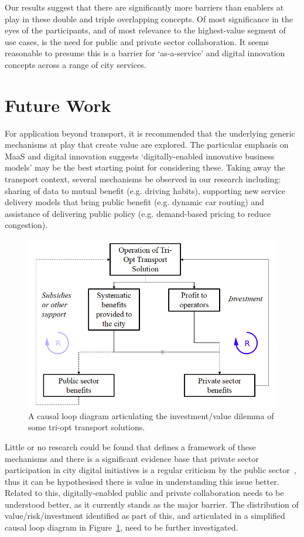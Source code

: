 \documentclass[b5paper,10pt]{article}
\begin{document}
Our results suggest that there are significantly more barriers than
enablers at play in these double and triple overlapping concepts. Of
most significance in the eyes of the participants, and of most
relevance to the highest-value segment of use cases, is the need for
public and private sector collaboration. It seems reasonable to
presume this is a barrier for `as-a-service' and digital innovation
concepts across a range of city services.

\section{Future Work}\label{future}

For application beyond transport, it is recommended that the
underlying generic mechanisms at play that create value are
explored. The particular emphasis on MaaS and digital innovation
suggests `digitally-enabled innovative business models' may be the
best starting point for considering these. Taking away the transport
context, several mechanisms be observed in our research including:
sharing of data to mutual benefit (e.g. driving habits), supporting
new service delivery models that bring public benefit (e.g. dynamic
car routing) and assistance of delivering public policy
(e.g. demand-based pricing to reduce congestion).

\begin{figure}[!h]
\centering
\includegraphics[width=0.7\columnwidth]{images/causalloop.png}
\caption{A causal loop diagram articulating the investment/value
  dilemma of some tri-opt transport solutions.}
\label{fig:causalloop}
\end{figure}

Little or no research could be found that defines a framework of these
mechanisms and there is a significant evidence base that private
sector participation in city digital initiatives is a regular
criticism by the public sector~\citep{martin:2016}, thus it can be
hypothesised there is value in understanding this issue
better. Related to this, digitally-enabled public and private
collaboration needs to be understood better, as it currently stands as
the major barrier. The distribution of value/risk/investment
identified as part of this, and articulated in a simplified causal
loop diagram in Figure~\ref{fig:causalloop}, need to be further
investigated.
\end{document}
